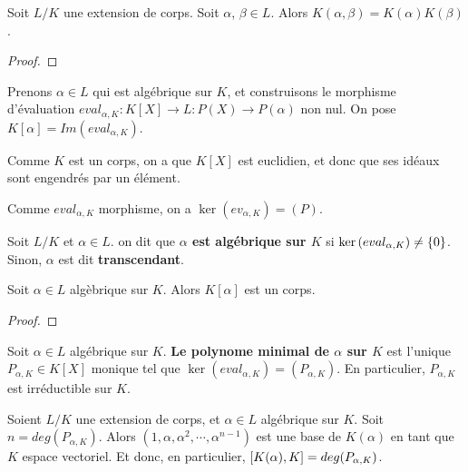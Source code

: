 \begin{proposition}
	Soit $L/K$ une extension de corps. Soit $\alpha$, $\beta \in L$.
	Alors $K(\alpha, \beta) = K(\alpha)K(\beta)$.
\end{proposition}

\ifdefined\outputproof
\begin{proof}

\end{proof}
\fi

Prenons $\alpha \in L$ qui est algébrique sur $K$, et construisons le morphisme
d'évaluation $eval_{\alpha, K} : K[X] \rightarrow L : P(X) \rightarrow P(\alpha)$
non nul. On pose $K[\alpha] = Im(eval_{\alpha, K})$.

Comme $K$ est un corps, on a que $K[X]$ est euclidien, et donc que ses idéaux
sont engendrés par un élément.

Comme $eval_{\alpha, K}$ morphisme, on a $\ker{(ev_{\alpha, K})} = (P)$.

\begin{definition} 
	Soit $L/K$ et $\alpha \in L$. on dit que \textbf{$\alpha$ est algébrique sur
	$K$} si $\ker{(eval_{\alpha, K})} \neq \left\{ 0 \right\}$.
	Sinon, $\alpha$ est dit \textbf{transcendant}.
\end{definition}

\begin{proposition}
	Soit $\alpha \in L$ algèbrique sur $K$. Alors $K[\alpha]$ est un corps.
\end{proposition}

\ifdefined\outputproof
\begin{proof}

\end{proof}
\fi

\begin{definition} 
	Soit $\alpha \in L$ algébrique sur $K$. \textbf{Le polynome minimal de $\alpha$ sur
	$K$} est l'unique $P_{\alpha, K} \in K[X]$ monique tel que $\ker{(eval_{\alpha,
	K})} = (P_{\alpha, K})$. En particulier, $P_{\alpha, K}$ est irréductible
	sur $K$.
\end{definition}

\begin{proposition}
	\label{prop:extension_finie_alpha_equiv_alpha_algebrique}
	Soient $L/K$ une extension de corps, et $\alpha \in L$ algébrique sur $K$.
	Soit $n = deg(P_{\alpha, K})$.
	Alors $(1, \alpha, \alpha^{2}, \cdots, \alpha^{n - 1})$ est une base de $K(\alpha)$ en tant que $K$
	espace vectoriel. Et donc, en particulier, $[K(\alpha), K] =
	deg(P_{\alpha, K})$.
\end{proposition}

